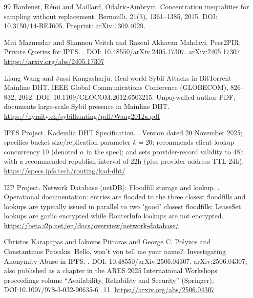 \documentclass[11pt]{article}
\begin{document}
\begin{thebibliography}{99}
Bardenet, R{\'e}mi and Maillard, Odalric-Ambrym.
\newblock Concentration inequalities for sampling without replacement.
\newblock Bernoulli, 21(3), 1361--1385, 2015.
\newblock DOI: 10.3150/14-BEJ605.
\newblock Preprint: arXiv:1309.4029.

Miti Mazmudar and Shannon Veitch and Rasoul Akhavan Mahdavi.
\newblock Peer2PIR: Private Queries for {IPFS}.
.
\newblock DOI: 10.48550/arXiv.2405.17307.
\newblock arXiv:2405.17307
\newblock \url{https://arxiv.org/abs/2405.17307}

Liang Wang and Jussi Kangasharju.
\newblock Real-world Sybil Attacks in {BitTorrent} Mainline {DHT}.
 {IEEE} Global Communications Conference (GLOBECOM), 826--832, 2012.
\newblock DOI: 10.1109/GLOCOM.2012.6503215.
\newblock Unpaywalled author PDF; documents large-scale Sybil presence in Mainline DHT.
\newblock \url{https://nymity.ch/sybilhunting/pdf/Wang2012a.pdf}

{IPFS Project}.
 {K}ademlia {DHT} Specification.
.
\newblock Version dated 20 November 2025; specifies bucket size/replication parameter $k=20$; recommends client lookup concurrency 10 (denoted $\alpha$ in the spec); and sets provider-record validity to 48h with a recommended republish interval of 22h (plus provider-address TTL 24h).
\newblock \url{https://specs.ipfs.tech/routing/kad-dht/}

{I2P Project}.
\newblock Network Database (netDB): Floodfill storage and lookup.
.
\newblock Operational documentation: entries are flooded to the three closest floodfills and lookups are typically issued in parallel to two "good" closest floodfills; LeaseSet lookups are garlic encrypted while RouterInfo lookups are not encrypted.
\newblock \url{https://beta.i2p.net/en/docs/overview/network-database/}

Christos Karapapas and Iakovos Pittaras and George C. Polyzos and Constantinos Patsakis.
\newblock Hello, won't you tell me your name?: Investigating Anonymity Abuse in {IPFS}.
.
\newblock DOI: 10.48550/arXiv.2506.04307.
\newblock arXiv:2506.04307; also published as a chapter in the ARES 2025 International Workshops proceedings volume ``Availability, Reliability and Security'' (Springer), DOI:10.1007/978-3-032-00635-6\_11.
\newblock \url{https://arxiv.org/abs/2506.04307}


\end{thebibliography}
\end{document}
